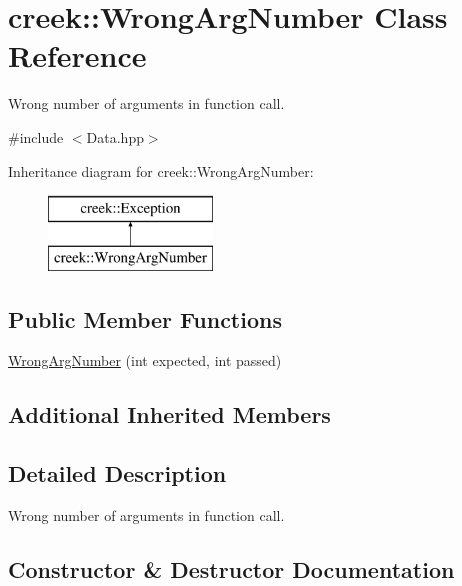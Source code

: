 \hypertarget{classcreek_1_1_wrong_arg_number}{}\section{creek\+:\+:Wrong\+Arg\+Number Class Reference}
\label{classcreek_1_1_wrong_arg_number}


Wrong number of arguments in function call.  




{\ttfamily \#include $<$Data.\+hpp$>$}

Inheritance diagram for creek\+:\+:Wrong\+Arg\+Number\+:\begin{figure}[H]
\begin{center}
\leavevmode
\includegraphics[height=2.000000cm]{classcreek_1_1_wrong_arg_number}
\end{center}
\end{figure}
\subsection*{Public Member Functions}
\begin{DoxyCompactItemize}
\item 
\hyperlink{classcreek_1_1_wrong_arg_number_a3a170e4e51077a5f37766b65181b0a86}{Wrong\+Arg\+Number} (int expected, int passed)
\end{DoxyCompactItemize}
\subsection*{Additional Inherited Members}


\subsection{Detailed Description}
Wrong number of arguments in function call. 

\subsection{Constructor \& Destructor Documentation}
